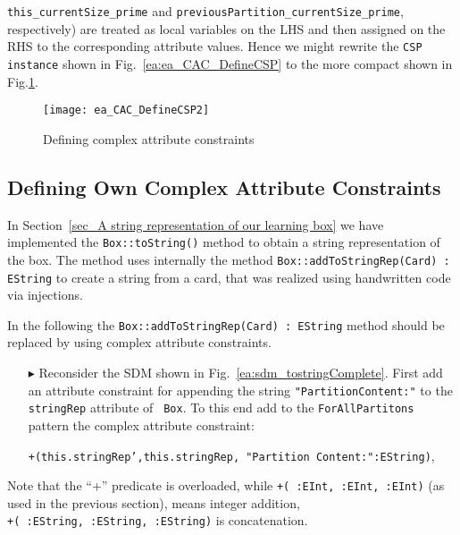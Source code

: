 \texttt{this\_currentSize\_prime} and \texttt{previousPartition\_currentSize\_prime}, respectively) are treated as local variables on the LHS and then assigned on the RHS to the corresponding attribute values.
Hence we might rewrite the \texttt{CSP instance} shown in Fig.~\ref{ea:ea_CAC_DefineCSP} to the more compact shown in Fig.\ref{ea:ea_CAC_DefineCSP2}.
\begin{figure}[htbp]
\begin{center}
  \texttt{[image: ea\_CAC\_DefineCSP2]}
  \caption{Defining complex attribute constraints}  
  \label{ea:ea_CAC_DefineCSP2}
\end{center}
\end{figure}

\subsection{Defining Own Complex Attribute Constraints}  
In Section~\ref{sec_A string representation of our learning box} we have implemented the \texttt{Box::toString()} method to obtain a string representation of the box. 
The method uses internally the method \texttt{Box::addToStringRep(Card) : EString} to create a string from a card, that was realized using handwritten code via injections.

In the following the \texttt{Box::addToStringRep(Card) : EString} method should be replaced by using complex attribute constraints.

\begin{itemize}
  \item[$\blacktriangleright$] Reconsider the SDM shown in Fig.~\ref{ea:sdm_tostringComplete}. First add an attribute constraint for appending the string \texttt{"PartitionContent:"} to the \texttt{stringRep} attribute of \texttt{ Box}. To this end add to the \texttt{ForAllPartitons} pattern the complex attribute constraint:

\texttt{\small +(this.stringRep',this.stringRep, "Partition Content:":EString)},\\

\end{itemize}  
Note that the ``+'' predicate is overloaded, while \texttt{\small +( :EInt, :EInt, :EInt)} (as used in the previous section), means integer addition, \\
  \texttt{\small +( :EString, :EString, :EString)} is concatenation.
   	  


